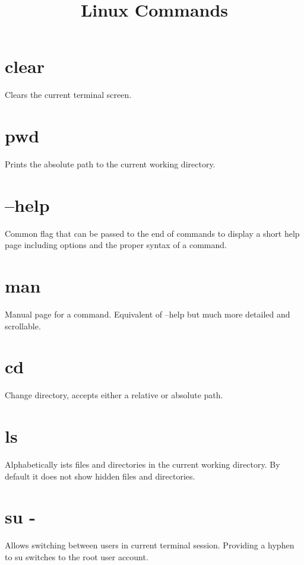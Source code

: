 \documentclass[]{article}
\title{Linux Commands}
\author{}
\begin{document}
\maketitle

\section{clear}

Clears the current terminal screen.

\section{pwd}

Prints the absolute path to the current working directory.

\section{--help}

Common flag that can be passed to the end of commands to display a short help page including options and the proper syntax of a command.

\section{man}

Manual page for a command. Equivalent of --help but much more detailed and scrollable.

\section{cd}

Change directory, accepts either a relative or absolute path.

\section{ls}

Alphabetically ists files and directories in the current working directory. By default it does not show hidden files and directories.

\section{su -}

Allows switching between users in current terminal session. Providing a hyphen to su switches to the root user account.
\end{document}
